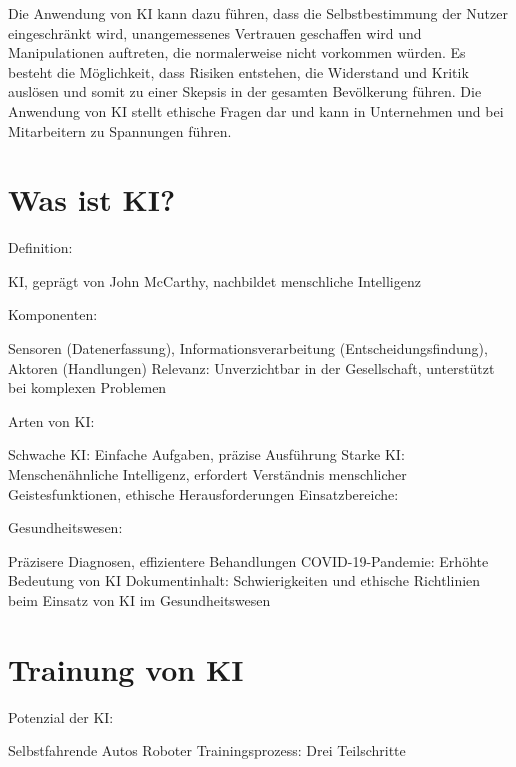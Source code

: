\documentclass{article}
\begin{document}
\vspace{2mm}Die Anwendung von KI kann dazu führen, dass die Selbstbestimmung der Nutzer eingeschränkt wird, unangemessenes Vertrauen geschaffen wird und Manipulationen auftreten, die normalerweise nicht vorkommen würden. Es besteht die Möglichkeit, dass Risiken entstehen, die Widerstand und Kritik auslösen und somit zu einer Skepsis in der gesamten Bevölkerung führen. Die Anwendung von KI stellt ethische Fragen dar und kann in Unternehmen und bei Mitarbeitern zu Spannungen führen.



\section{Was ist KI?}

\vspace{2mm}Definition:

\vspace{2mm}KI, geprägt von John McCarthy, nachbildet menschliche Intelligenz

\vspace{2mm}Komponenten:

\vspace{2mm}Sensoren (Datenerfassung), Informationsverarbeitung (Entscheidungsfindung), Aktoren (Handlungen)
Relevanz: Unverzichtbar in der Gesellschaft, unterstützt bei komplexen Problemen

\vspace{2mm}Arten von KI:

\vspace{2mm}Schwache KI: Einfache Aufgaben, präzise Ausführung
Starke KI: Menschenähnliche Intelligenz, erfordert Verständnis menschlicher Geistesfunktionen, ethische Herausforderungen
Einsatzbereiche:

\vspace{2mm}Gesundheitswesen:

\vspace{2mm}Präzisere Diagnosen, effizientere Behandlungen
COVID-19-Pandemie: Erhöhte Bedeutung von KI
Dokumentinhalt: Schwierigkeiten und ethische Richtlinien beim Einsatz von KI im Gesundheitswesen



\section{Trainung von KI}
Potenzial der KI:

\vspace{2mm}Selbstfahrende Autos
Roboter
Trainingsprozess: Drei Teilschritte
\end{document}
